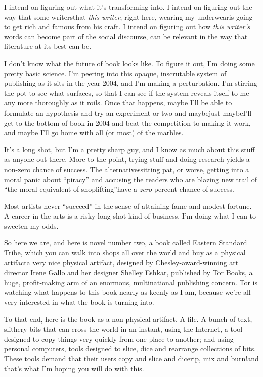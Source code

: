 I intend on figuring out what it’s transforming into. I intend on
figuring out the way that some writers{\dash}that \emph{this writer},
right here, wearing my underwear{\dash}is going to get rich and famous
from his craft. I intend on figuring out how \emph{this writer’s}
words can become part of the social discourse, can be relevant in
the way that literature at its best can be.

I don’t know what the future of book looks like. To figure it out,
I’m doing some pretty basic science. I’m peering into this opaque,
inscrutable system of publishing as it sits in the year 2004, and
I’m making a perturbation. I’m stirring the pot to see what
surfaces, so that I can see if the system reveals itself to me any
more thoroughly as it roils. Once that happens, maybe I’ll be able
to formulate an hypothesis and try an experiment or two and
maybe{\dash}just maybe{\dash}I’ll get to the bottom of book-in-2004 and beat
the competition to making it work, and maybe I’ll go home with all
(or most) of the marbles.

It’s a long shot, but I’m a pretty sharp guy, and I know as much
about this stuff as anyone out there. More to the point, trying
stuff and doing research yields a non-zero chance of success. The
alternatives{\dash}sitting pat, or worse, getting into a moral panic
about “piracy” and accusing the readers who are blazing new trail
of “the moral equivalent of shoplifting”{\dash}have a \emph{zero} percent
chance of success.

Most artists never “succeed” in the sense of attaining fame and
modest fortune. A career in the arts is a risky long-shot kind of
business. I’m doing what I can to sweeten my odds.

So here we are, and here is novel number two, a book called Eastern
Standard Tribe, which you can walk into shops all over the world
and
\href{http://craphound.com/est/buy.php}{buy as a physical artifact}{\dash}a
very nice physical artifact, designed by Chesley-award-winning art
director Irene Gallo and her designer Shelley Eshkar, published by
Tor Books, a huge, profit-making arm of an enormous, multinational
publishing concern. Tor is watching what happens to this book
nearly as keenly as I am, because we’re all very interested in what
the book is turning into.

To that end, here is the book as a non-physical artifact. A file. A
bunch of text, slithery bits that can cross the world in an
instant, using the Internet, a tool designed to copy things very
quickly from one place to another; and using personal computers,
tools designed to slice, dice and rearrange collections of bits.
These tools demand that their users copy and slice and dice{\dash}rip,
mix and burn!{\dash}and that’s what I’m hoping you will do with this.

